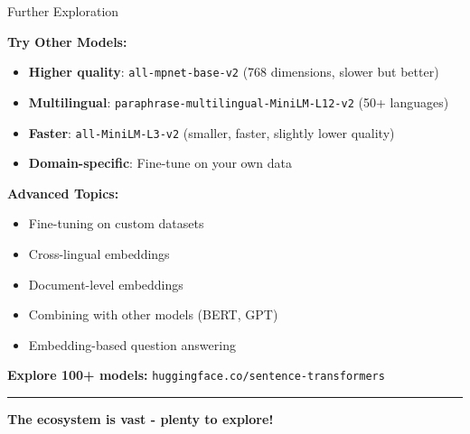 \documentclass[8pt,aspectratio=169]{beamer}
\newcommand{\bottomnote}[1]{%
\vfill
\vspace{-2mm}
\textcolor{mllavender2}{\rule{\textwidth}{0.4pt}}
\vspace{1mm}
\footnotesize
\textbf{#1}
}
\begin{document}
\begin{frame}[t]{Further Exploration}

\textbf{Try Other Models:}

\begin{itemize}
    \item \textbf{Higher quality}: \texttt{all-mpnet-base-v2} (768 dimensions, slower but better)
    \item \textbf{Multilingual}: \texttt{paraphrase-multilingual-MiniLM-L12-v2} (50+ languages)
    \item \textbf{Faster}: \texttt{all-MiniLM-L3-v2} (smaller, faster, slightly lower quality)
    \item \textbf{Domain-specific}: Fine-tune on your own data
\end{itemize}

\vspace{0.5cm}

\textbf{Advanced Topics:}

\begin{itemize}
    \item Fine-tuning on custom datasets
    \item Cross-lingual embeddings
    \item Document-level embeddings
    \item Combining with other models (BERT, GPT)
    \item Embedding-based question answering
\end{itemize}

\vspace{0.5cm}

\textbf{Explore 100+ models:} \texttt{huggingface.co/sentence-transformers}

\bottomnote{The ecosystem is vast - plenty to explore!}
\end{frame}
\end{document}
